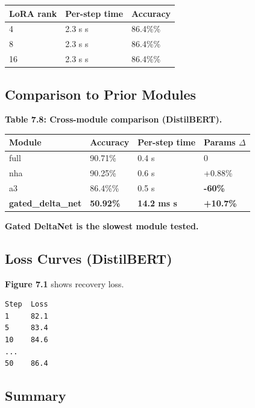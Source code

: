 \begin{table}[H]
\centering
\small
\begin{tabular}{lll}
\toprule
\textbf{LoRA rank} & \textbf{Per-step time} & \textbf{Accuracy} \\
\midrule
4 & 2.3 s s & 86.4\%\% \\
8 & 2.3 s s & 86.4\%\% \\
16 & 2.3 s s & 86.4\%\% \\
\bottomrule
\end{tabular}
\end{table}

\subsection{Comparison to Prior Modules}

\textbf{Table 7.8: Cross-module comparison (DistilBERT).}

\begin{table}[H]
\centering
\small
\begin{tabular}{llll}
\toprule
\textbf{Module} & \textbf{Accuracy} & \textbf{Per-step time} & \textbf{Params $\Delta$} \\
\midrule
full & 90.71\% & 0.4 s & 0 \\
nha & 90.25\% & 0.6 s & +0.88\% \\
a3 & 86.4\%\% & 0.5 s & \textbf{-60\%} \\
\textbf{gated\_delta\_net} & \textbf{50.92\%} & \textbf{14.2 ms s} & \textbf{+10.7\%} \\
\bottomrule
\end{tabular}
\end{table}

\textbf{Gated DeltaNet is the slowest module tested.}

\subsection{Loss Curves (DistilBERT)}

\textbf{Figure 7.1} shows recovery loss.

\begin{lstlisting}
Step  Loss
1     82.1
5     83.4
10    84.6
...
50    86.4
\end{lstlisting}

\subsection{Summary}

